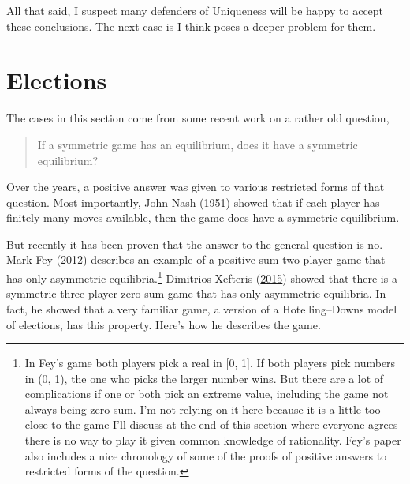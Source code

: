 \documentclass[
  12pt,
  letterpaper,
  DIV=11,
  numbers=noendperiod]{scrreprt}
\begin{document}
All that said, I suspect many defenders of Uniqueness will be happy to
accept these conclusions. The next case is I think poses a deeper
problem for them.

\hypertarget{elections}{%
\section{Elections}\label{elections}}

The cases in this section come from some recent work on a rather old
question,

\begin{quote}
If a symmetric game has an equilibrium, does it have a symmetric
equilibrium?
\end{quote}

Over the years, a positive answer was given to various restricted forms
of that question. Most importantly, John Nash
(\protect\hyperlink{ref-Nash1951}{1951}) showed that if each player has
finitely many moves available, then the game does have a symmetric
equilibrium.

But recently it has been proven that the answer to the general question
is no. Mark Fey (\protect\hyperlink{ref-Fey2012}{2012}) describes an
example of a positive-sum two-player game that has only asymmetric
equilibria.\footnote{In Fey's game both players pick a real in {[}0,
  1{]}. If both players pick numbers in (0, 1), the one who picks the
  larger number wins. But there are a lot of complications if one or
  both pick an extreme value, including the game not always being
  zero-sum. I'm not relying on it here because it is a little too close
  to the game I'll discuss at the end of this section where everyone
  agrees there is no way to play it given common knowledge of
  rationality. Fey's paper also includes a nice chronology of some of
  the proofs of positive answers to restricted forms of the question.}
Dimitrios Xefteris (\protect\hyperlink{ref-Xefteris2015}{2015}) showed
that there is a symmetric three-player zero-sum game that has only
asymmetric equilibria. In fact, he showed that a very familiar game, a
version of a Hotelling--Downs model of elections, has this property.
Here's how he describes the game.
\end{document}

